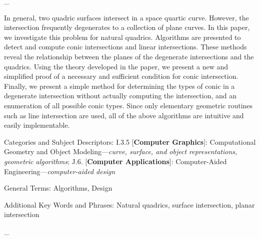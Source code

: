 \def\thefootnote{\arabic{footnote}}
\setcounter{footnote}{0}



\begin{center}
\begin{minipage}{14cm}
{\small
\_$\!$\hrulefill
\noindent

     In general, two quadric surfaces intersect in a space quartic curve.
However, the intersection  frequently degenerates to  a collection of
plane curves.  In this paper, we investigate this problem
for natural quadrics.  Algorithms are presented to detect and compute
conic intersections and linear intersections.
These methods reveal the relationship between the planes of the degenerate
intersections and the quadrics.  Using the theory developed in the paper,
we present a new and simplified proof of a necessary and sufficient
condition for conic intersection.
Finally, we present a simple method for
determining the types of conic in a degenerate intersection
without actually computing the intersection,
and an enumeration of all possible conic types.
Since only elementary geometric routines such as line intersection
are used, all of the above algorithms are intuitive and easily implementable.
\\
\par
Categories and Subject Descriptors: I.3.5 [{\bf Computer Graphics}]:
Computational Geometry and Object Modeling---{\em curve, surface, and object
representations, geometric algorithms}; J.6. [{\bf Computer Applications}]:
Computer-Aided Engineering---{\em computer-aided design}
\\
\par
General Terms: Algorithms, Design
\\
\par
Additional Key Words and Phrases: Natural quadrics, surface intersection,
planar intersection

\_$\!$\hrulefill

}
\end{minipage}
\end{center}


%

